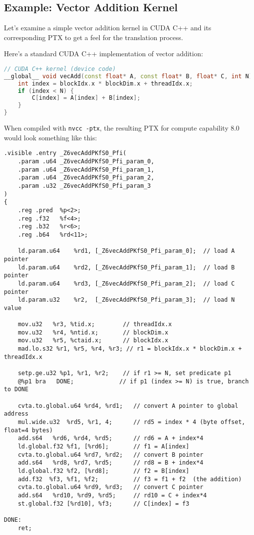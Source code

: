 \subsection{Example: Vector Addition Kernel}

Let's examine a simple vector addition kernel in CUDA C++ and its corresponding PTX to get a feel for the translation process.

Here's a standard CUDA C++ implementation of vector addition:

\begin{lstlisting}[language=C++]
// CUDA C++ kernel (device code)
__global__ void vecAdd(const float* A, const float* B, float* C, int N) {
    int index = blockIdx.x * blockDim.x + threadIdx.x;
    if (index < N) {
        C[index] = A[index] + B[index];
    }
}
\end{lstlisting}

When compiled with \texttt{nvcc -ptx}, the resulting PTX for compute capability 8.0 would look something like this:

\begin{lstlisting}[style=ptx]
.visible .entry _Z6vecAddPKfS0_Pfi(
    .param .u64 _Z6vecAddPKfS0_Pfi_param_0,
    .param .u64 _Z6vecAddPKfS0_Pfi_param_1,
    .param .u64 _Z6vecAddPKfS0_Pfi_param_2,
    .param .u32 _Z6vecAddPKfS0_Pfi_param_3
)
{
    .reg .pred  %p<2>;
    .reg .f32   %f<4>;
    .reg .b32   %r<6>;
    .reg .b64   %rd<11>;

    ld.param.u64    %rd1, [_Z6vecAddPKfS0_Pfi_param_0];  // load A pointer
    ld.param.u64    %rd2, [_Z6vecAddPKfS0_Pfi_param_1];  // load B pointer
    ld.param.u64    %rd3, [_Z6vecAddPKfS0_Pfi_param_2];  // load C pointer
    ld.param.u32    %r2,  [_Z6vecAddPKfS0_Pfi_param_3];  // load N value

    mov.u32   %r3, %tid.x;        // threadIdx.x
    mov.u32   %r4, %ntid.x;       // blockDim.x
    mov.u32   %r5, %ctaid.x;      // blockIdx.x
    mad.lo.s32 %r1, %r5, %r4, %r3; // r1 = blockIdx.x * blockDim.x + threadIdx.x

    setp.ge.u32 %p1, %r1, %r2;    // if r1 >= N, set predicate p1
    @%p1 bra   DONE;             // if p1 (index >= N) is true, branch to DONE

    cvta.to.global.u64 %rd4, %rd1;   // convert A pointer to global address
    mul.wide.u32  %rd5, %r1, 4;      // rd5 = index * 4 (byte offset, float=4 bytes)
    add.s64   %rd6, %rd4, %rd5;      // rd6 = A + index*4
    ld.global.f32 %f1, [%rd6];       // f1 = A[index]
    cvta.to.global.u64 %rd7, %rd2;   // convert B pointer
    add.s64   %rd8, %rd7, %rd5;      // rd8 = B + index*4
    ld.global.f32 %f2, [%rd8];       // f2 = B[index]
    add.f32  %f3, %f1, %f2;          // f3 = f1 + f2  (the addition)
    cvta.to.global.u64 %rd9, %rd3;   // convert C pointer
    add.s64   %rd10, %rd9, %rd5;     // rd10 = C + index*4
    st.global.f32 [%rd10], %f3;      // C[index] = f3

DONE:
    ret;
\end{lstlisting}

